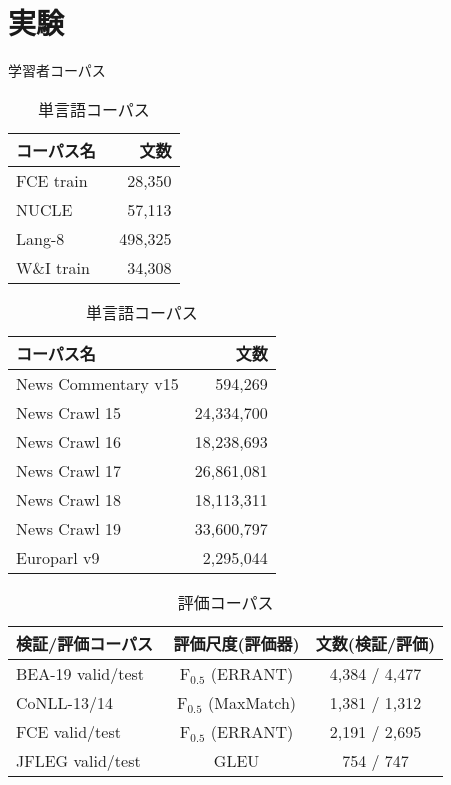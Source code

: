 \documentclass[
  platex, dvipdfmx %
]{nlp2021}
\begin{document}
\section{実験}
\begin{table}[t]
	\begin{minipage}[c]{.19\textwidth}
			\small
			\tabcolsep 1pt
			\centering
			\caption{学習者コーパス}
			\label{tab:lerner_corpus}
			\begin{tabular}{lr}
				\hline
				コーパス名 & 文数 \\
				\hline
				FCE train ~\cite{yannakoudakis-etal-2011-new} & 28,350 \\
				NUCLE ~\cite{dahlmeier-etal-2013-building} & 57,113 \\
				Lang-8 ~\cite{mizumoto-etal-2012-effect} & 498,325 \\
				W\&I train ~\cite{bryant-etal-2019-bea} & 34,308 \\
				\hline
			\end{tabular}
	\end{minipage}
	\begin{minipage}[c]{.28\textwidth}
			\small
			\centering
			\tabcolsep 1pt
			\caption{単言語コーパス}
			\label{tab:monolingual_corpus}
			\begin{tabular}{lr}
				\hline
				コーパス名 & 文数 \\
				\hline
				News Commentary v15 & 594,269 \\
				News Crawl 15 & 24,334,700 \\
				News Crawl 16 & 18,238,693 \\
				News Crawl 17 & 26,861,081 \\
				News Crawl 18 & 18,113,311 \\
				News Crawl 19 & 33,600,797 \\
				Europarl v9 & 2,295,044 \\
				\hline
			\end{tabular}
	\end{minipage}
\end{table}

\begin{table}[t]
	\small
	\centering
	\tabcolsep 1pt
	\caption{評価コーパス}
	\label{tab:eval_corpus}
	\begin{tabular}{lcc}
		\hline
		検証/評価コーパス & 評価尺度(評価器) & 文数(検証/評価) \\
		\hline
		BEA-19 valid/test ~\cite{bryant-etal-2019-bea} & $\text{F}_{0.5}$ (ERRANT) & 4,384 / 4,477 \\
		CoNLL-13/14 ~\cite{ng-etal-2014-conll} & $\text{F}_{0.5}$ (MaxMatch) & 1,381 / 1,312 \\
		FCE valid/test ~\cite{yannakoudakis-etal-2011-new} & $\text{F}_{0.5}$ (ERRANT) & 2,191 / 2,695 \\
		JFLEG valid/test ~\cite{napoles-etal-2017-jfleg} & GLEU & 754 / 747 \\
		\hline
	\end{tabular}
\end{table}
\end{document}
